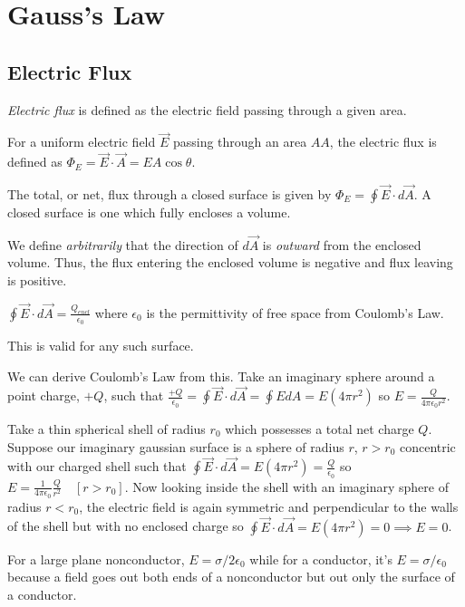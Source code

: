 \chapter{Gauss's Law}

\section{Electric Flux}

\begin{definition}
    \emph{Electric flux} is defined as the electric field passing through a given area.
\end{definition}
\begin{remark}
    For a uniform electric field $\vec{E}$ passing through an area $AA$, the electric flux is defined as $\Phi_E = \vec{E}\cdot\vec{A}=EA\cos\theta.$
\end{remark}
\begin{remark}
    The total, or net, flux through a closed surface is given by $\Phi_E = \oint\vec{E}\cdot d\vec{A}.$ A closed surface is one which fully encloses a volume.
\end{remark}
\begin{remark}
    We define \emph{arbitrarily} that the direction of $d\vec{A}$ is \emph{outward} from the enclosed volume. Thus, the flux entering the enclosed volume is negative and flux leaving is positive.
\end{remark}
\begin{definition}
    $\oint\vec{E}\cdot d\vec{A} = \frac{Q_{encl}}{\epsilon_0}$ where $\epsilon_0$ is the permittivity of free space from Coulomb's Law. 
\end{definition}
\begin{note}
    This is valid for any such surface.
\end{note}
\begin{remark}
    We can derive Coulomb's Law from this. Take an imaginary sphere around a point charge, $+Q$, such that $\frac{+Q}{\epsilon_0} = \oint\vec{E}\cdot d\vec{A} = \oint EdA = E(4\pi r^2)$ so $E = \frac{Q}{4\pi\epsilon_0r^2}.$
\end{remark}
\begin{example}
    Take a thin spherical shell of radius $r_0$ which possesses a total net charge $Q$. Suppose our imaginary gaussian surface is a sphere of radius $r$, $r >r_0$ concentric with our charged shell such that $\oint\vec{E}\cdot d\vec{A} = E(4\pi r^2) = \frac{Q}{\epsilon_0}$ so $E = \frac{1}{4\pi\epsilon_0}\frac{Q}{r^2} \quad [r>r_0]$. Now looking inside the shell with an imaginary sphere of radius $r < r_0$, the electric field is again symmetric and perpendicular to the walls of the shell but with no enclosed charge so $\oint \vec{E}\cdot d\vec{A} = E(4\pi r^2) = 0 \implies E = 0$.
\end{example}
\begin{note}
    For a large plane nonconductor, $E = \sigma/2\epsilon_0$ while for a conductor, it's $E = \sigma/\epsilon_0$ because a field goes out both ends of a nonconductor but out only the surface of a conductor.
\end{note}